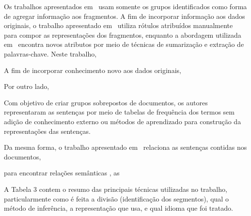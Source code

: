 Os trabalhos apresentados em~\cite{} usam somente os grupos identificados como forma de agregar informação aos fragmentos. 
A fim de incorporar informação aos dados originais, o trabalho apresentado em~\cite{Masao:2000} utiliza rótulos atribuídos manualmente para compor as representações dos 
fragmentos, enquanto a abordagem utilizada em~\cite{Cuong2011} encontra novos atributos por meio de técnicas de sumarização e extração de palavras-chave. 
Neste trabalho, 






A fim de incorporar conhecimento novo aos dados originais, 



Por outro lado, 



Com objetivo de criar grupos sobrepostos de documentos, os autores representaram as sentenças por meio de tabelas de frequência dos termos sem adição de conhecimento externo ou métodos de aprendizado para construção da representações das sentenças. 










Da mesma forma, o trabalho apresentado em~\cite{Masao:2000} relaciona as sentenças contidas nos documentos, 





para encontrar relações semânticas , as 



A Tabela 3 contem o resumo das principais técnicas utilizadas no trabalho, particularmente como é feita a divisão (identificação dos segmentos), qual o método de inferência, a representação que usa, e qual idioma que foi tratado. 

